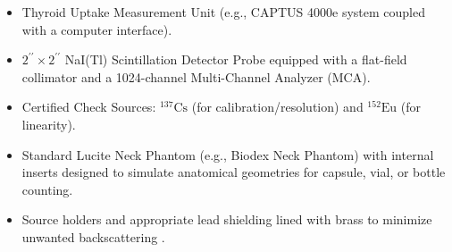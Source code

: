 \begin{itemize}
    \item Thyroid Uptake Measurement Unit (e.g., CAPTUS 4000e system coupled with a computer interface).
    \item $2^{\prime\prime} \times 2^{\prime\prime}$ NaI(Tl) Scintillation Detector Probe equipped with a flat-field collimator and a 1024-channel Multi-Channel Analyzer (MCA).
    \item Certified Check Sources: $^{137}\text{Cs}$ (for calibration/resolution) and $^{152}\text{Eu}$ (for linearity).
    \item Standard Lucite Neck Phantom (e.g., Biodex Neck Phantom) with internal inserts designed to simulate anatomical geometries for capsule, vial, or bottle counting.
    \item Source holders and appropriate lead shielding lined with brass to minimize unwanted backscattering \cite{captus4000e}.
\end{itemize}